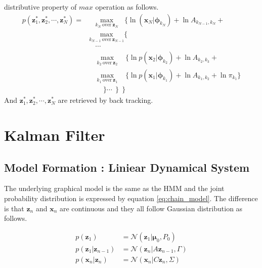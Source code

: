 \documentclass[a4]{article}
\begin{document}
distributive property of $max$ operation as follows. 
\begin{equation}
\begin{aligned}
p(\bm{z}_1^*, \bm{z}_2^*, \cdots, \bm{z}_N^*)
= &\:\:\:\:\underset{k_N \:\text{over} \:\bm{z}_N}{\mathrm{max}}\:\:\:\:\{
    \ln (\bm{x}_N|\bm{\phi}_{k_N}) + \ln A_{k_{N-1},k_N} +\\
      &\underset{k_{N-1} \:\text{over} \:\bm{z}_{N-1}}{\mathrm{max}} \{\\
          &\:\:\:\:\cdots\\
          &\:\:\:\:\:\underset{k_2 \:\text{over} \:\bm{z}_{2}}{\mathrm{max}}\:\:\:\:\:\{
              \ln p(\bm{x}_2|\bm{\phi}_{k_2}) + \ln A_{k_2,k_3} +\\
          &\:\:\:\:\:\underset{k_1 \:\text{over} \:\bm{z}_{1}}{\mathrm{max}}\:\:\:\:\:\{
              \ln p(\bm{x}_1|\bm{\phi}_{k_1}) + \ln A_{k_1,k_2} + \ln \pi_{k_1}\}\\
          &\:\:\:\:\:\:\:\:\:\}\cdots\:\:\}\:\:\}
\end{aligned}
\end{equation}
And $\bm{z}_1^*, \bm{z}_2^*, \cdots, \bm{z}_N^*$ are retrieved by back tracking.

\section{Kalman Filter}

\subsection{Model Formation : Liniear Dynamical System}
The underlying graphical model is the same as the HMM and the joint probability distribution is 
expressed by equation \ref{eq:chain_model}.
The difference is that $\bm{z}_n$ and $\bm{x}_n$ are continuous and they all follow Gaussian distribution
as follows.

\begin{equation}
\begin{aligned}
p(\bm{z}_1) &= \mathcal{N}(\bm{z}_1 | \bm{\mu}_0,P_0)\\
p(\bm{z}_1|\bm{z}_{n-1} ) &= \mathcal{N}(\bm{z}_n | A\bm{z}_{n-1}, \Gamma)\\
p(\bm{x}_n|\bm{z}_{n} )   &= \mathcal{N}(\bm{x}_n | C\bm{z}_{n},   \Sigma)\\
\end{aligned}
\end{equation}
\end{document}
